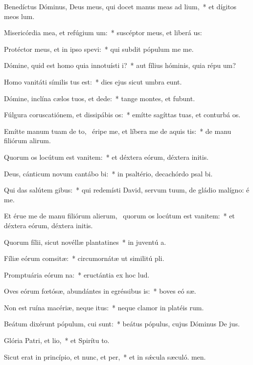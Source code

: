 \item Benedíctus Dóminus, Deus meus, qui docet manus meas ad lium,~* et dígitos meos  lum.
\item Misericórdia mea, et refúgium um:~* suscéptor meus, et liberá us:
\item Protéctor meus, et in ipso spevi:~* qui subdit pópulum me  me.
\item Dómine, quid est homo quia innotuísti i?~* aut fílius hóminis, quia répu um?
\item Homo vanitáti símilis tus est:~* dies ejus sicut umbra eunt.
\item Dómine, inclína cælos tuos, et dede:~* tange montes, et fubunt.
\item Fúlgura coruscatiónem, et dissipábis os:~* emítte sagíttas tuas, et conturbá os.
\item Emítte manum tuam de to,~\pscross{} éripe me, et líbera me de aquis tis:~* de manu filiórum alirum.
\item Quorum os locútum est vanitem:~* et déxtera eórum, déxtera initis.
\item Deus, cánticum novum cantábo bi:~* in psaltério, decachórdo psal bi.
\item Qui das salútem gibus:~* qui redemísti David, servum tuum, de gládio malígno: é me.
\item Et érue me de manu filiórum alierum,~\pscross{} quorum os locútum est vanitem:~* et déxtera eórum, déxtera initis.
\item Quorum fílii, sicut novéllæ plantatines~* in juventú a.
\item Fíliæ eórum comsitæ:~* circumornátæ ut similitú pli.
\item Promptuária eórum na:~* eructántia ex hoc  lud.
\item Oves eórum fœtósæ, abundántes in egréssibus is:~* boves eó sæ.
\item Non est ruína macériæ, neque itus:~* neque clamor in platéis rum.
\item Beátum dixérunt pópulum, cui  sunt:~* beátus pópulus, cujus Dóminus De jus.
\item Glória Patri, et lio,~* et Spirítu to.
\item Sicut erat in princípio, et nunc, et per,~* et in sǽcula sæculó. men.
